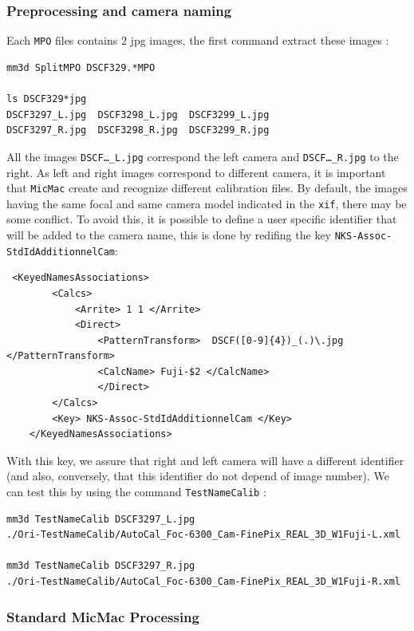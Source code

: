 \subsubsection{Preprocessing and camera naming}

Each {\tt MPO} files contains $2$ jpg images, the first  command extract these images : 

\begin{verbatim}
mm3d SplitMPO DSCF329.*MPO

ls DSCF329*jpg
DSCF3297_L.jpg	DSCF3298_L.jpg	DSCF3299_L.jpg
DSCF3297_R.jpg	DSCF3298_R.jpg	DSCF3299_R.jpg
\end{verbatim}

All the images {\tt DSCF\dots\_L.jpg} correspond the left camera and {\tt DSCF\dots\_R.jpg} to the right.
As left and right images correspond to different  camera, it is important that {\tt MicMac} create
and recognize different calibration files. By default, the images having the same focal and same camera
model indicated in the {\tt xif}, there may be some conflict. To avoid this, it is possible to define
a user specific identifier that will be added to the camera name, this is done by redifing the key
{\tt NKS-Assoc-StdIdAdditionnelCam}:

\begin{verbatim}
 <KeyedNamesAssociations>
        <Calcs>
            <Arrite> 1 1 </Arrite>
            <Direct>
                <PatternTransform>  DSCF([0-9]{4})_(.)\.jpg </PatternTransform>
                <CalcName> Fuji-$2 </CalcName>
                </Direct>
        </Calcs>
        <Key> NKS-Assoc-StdIdAdditionnelCam </Key>
    </KeyedNamesAssociations>
\end{verbatim}

With this key, we assure that right and left camera will have a different identifier (and also, conversely, that 
this identifier do not depend  of image number). We can test this by using the command  {\tt TestNameCalib} :


\begin{verbatim}
mm3d TestNameCalib DSCF3297_L.jpg
./Ori-TestNameCalib/AutoCal_Foc-6300_Cam-FinePix_REAL_3D_W1Fuji-L.xml

mm3d TestNameCalib DSCF3297_R.jpg
./Ori-TestNameCalib/AutoCal_Foc-6300_Cam-FinePix_REAL_3D_W1Fuji-R.xml
\end{verbatim}

\subsubsection{Standard MicMac Processing}

